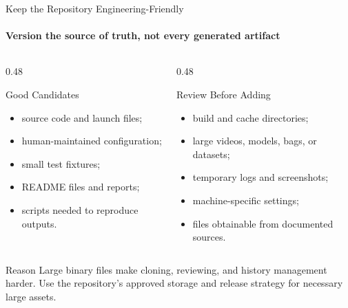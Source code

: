 \begin{frame}{Keep the Repository Engineering-Friendly}
\framesubtitle{Version the source of truth, not every generated artifact}
\footnotesize
\begin{columns}[T,onlytextwidth]
\begin{column}{0.48\textwidth}
\begin{block}{Good Candidates}
\begin{itemize}\setlength{\itemsep}{0.18em}
\item source code and launch files;
\item human-maintained configuration;
\item small test fixtures;
\item README files and reports;
\item scripts needed to reproduce outputs.
\end{itemize}
\end{block}
\end{column}
\begin{column}{0.48\textwidth}
\begin{exampleblock}{Review Before Adding}
\begin{itemize}\setlength{\itemsep}{0.18em}
\item build and cache directories;
\item large videos, models, bags, or datasets;
\item temporary logs and screenshots;
\item machine-specific settings;
\item files obtainable from documented sources.
\end{itemize}
\end{exampleblock}
\end{column}
\end{columns}
\begin{alertblock}{Reason}
Large binary files make cloning, reviewing, and history management harder. Use the repository's approved storage and release strategy for necessary large assets.
\end{alertblock}
\end{frame}

